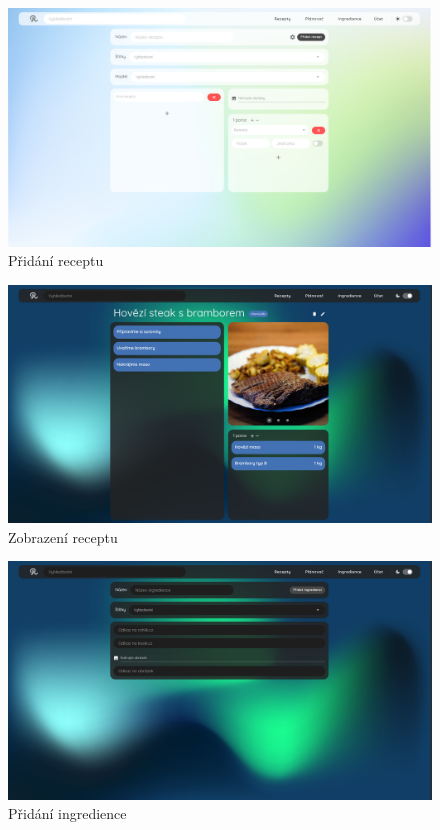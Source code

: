 \begin{figure}[H]
    \includegraphics[width=\textwidth]{images/final-look/pridani-receptu}
    \caption{Přidání receptu} \label{picture:recipeo:pridani-receptu}
\end{figure}

\begin{figure}[H]
    \includegraphics[width=\textwidth]{images/final-look/zobrazeni-receptu}
    \caption{Zobrazení receptu} \label{picture:recipeo:zobrazeni-receptu}
\end{figure}

\begin{figure}[H]
    \includegraphics[width=\textwidth]{images/final-look/pridani-ingredience}
    \caption{Přidání ingredience} \label{picture:recipeo:pridani-ingredience}
\end{figure}

